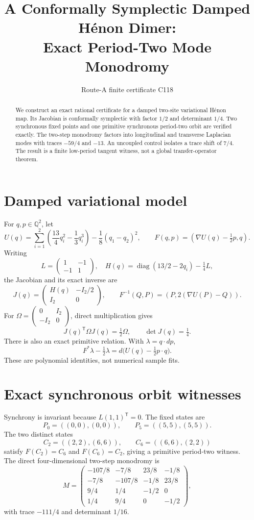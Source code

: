 \documentclass[10pt]{article}
\title{A Conformally Symplectic Damped H\'enon Dimer:\\ Exact Period-Two Mode Monodromy}
\author{Route-A finite certificate C118}
\date{}
\begin{document}
\maketitle
\begin{abstract}
We construct an exact rational certificate for a damped two-site variational
H\'enon map.  Its Jacobian is conformally symplectic with factor $1/2$ and
determinant $1/4$.  Two synchronous fixed points and one primitive synchronous
period-two orbit are verified exactly.  The two-step monodromy factors into
longitudinal and transverse Laplacian modes with traces $-59/4$ and $-13$.
An uncoupled control isolates a trace shift of $7/4$.  The result is a finite
low-period tangent witness, not a global transfer-operator theorem.
\end{abstract}

\section{Damped variational model}
For $q,p\in\mathbb Q^2$, let
\[
 U(q)=\sum_{i=1}^2\left(\frac{13}{4}q_i^2-\frac13q_i^3\right)
 -\frac18(q_1-q_2)^2,
 \qquad F(q,p)=(\nabla U(q)-\tfrac12p,q).
\]
Writing
\[
 L=\begin{pmatrix}1&-1\\-1&1\end{pmatrix},\quad
 H(q)=\operatorname{diag}(13/2-2q_i)-\tfrac14L,
\]
the Jacobian and its exact inverse are
\[
 J(q)=\begin{pmatrix}H(q)&-I_2/2\\I_2&0\end{pmatrix},\qquad
 F^{-1}(Q,P)=(P,2(\nabla U(P)-Q)).
\]
For $\Omega=\left(\begin{smallmatrix}0&I_2\\-I_2&0\end{smallmatrix}\right)$,
direct multiplication gives
\[
 J(q)^\mathsf T\Omega J(q)=\tfrac12\Omega,\qquad \det J(q)=\tfrac14.
\]
There is also an exact primitive relation.  With $\lambda=q\cdot dp$,
\[
 F^*\lambda-\tfrac12\lambda
 =d\bigl(U(q)-\tfrac12p\cdot q\bigr).
\]
These are polynomial identities, not numerical sample fits.

\section{Exact synchronous orbit witnesses}
Synchrony is invariant because $L(1,1)^\mathsf T=0$.  The fixed states are
\[
 P_0=((0,0),(0,0)),\qquad P_5=((5,5),(5,5)).
\]
The two distinct states
\[
 C_2=((2,2),(6,6)),\qquad C_6=((6,6),(2,2))
\]
satisfy $F(C_2)=C_6$ and $F(C_6)=C_2$, giving a primitive period-two
witness.  The direct four-dimensional two-step monodromy is
\[
 M=\begin{pmatrix}
 -107/8&-7/8&23/8&-1/8\\
 -7/8&-107/8&-1/8&23/8\\
 9/4&1/4&-1/2&0\\1/4&9/4&0&-1/2
 \end{pmatrix},
\]
with trace $-111/4$ and determinant $1/16$.
\end{document}
